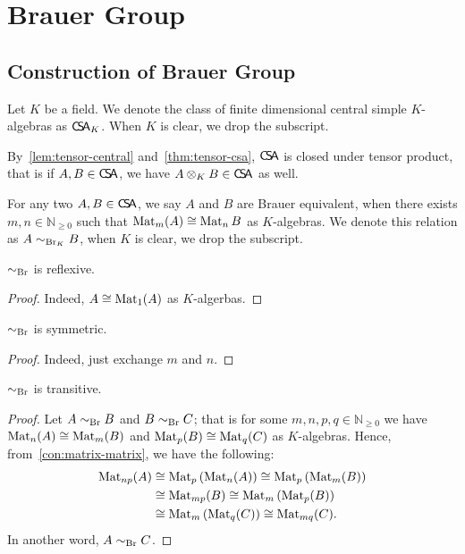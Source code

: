 \chapter{Brauer Group}\label{cha:brauer-group}

\section{Construction of Brauer Group}
Let $K$ be a field. We denote the class of finite dimensional central simple $K$-algebras as $\operatorname{\mathsf{C}\!\mathsf{S}\!\mathsf{A}}_{K}$. When $K$ is clear, we drop the subscript.

\begin{remark}
  By~\cref{lem:tensor-central} and~\cref{thm:tensor-csa}, $\operatorname{\mathsf{C}\!\mathsf{S}\!\mathsf{A}}$ is closed under tensor product, that is if $A, B\in\operatorname{\mathsf{C}\!\mathsf{S}\!\mathsf{A}}$, we have $A\otimes_{K} B\in\operatorname{\mathsf{C}\!\mathsf{S}\!\mathsf{A}}$ as well.
\end{remark}

\begin{definition}
  For any two $A, B\in\operatorname{\mathsf{C}\!\mathsf{S}\!\mathsf{A}}$, we say $A$ and $B$ are Brauer equivalent, when there exists $m, n \in \mathbb{N}_{\ge0}$ such that $\operatorname{Mat}_{m}(A)\cong \operatorname{Mat}_{n}B$ as $K$-algebras. We denote this relation as $A\sim_{\operatorname{Br}_{K}} B$, when $K$ is clear, we drop the subscript.
\end{definition}

\begin{lemma}
  $\sim_{\operatorname{Br}}$ is reflexive.
  \leanok
\end{lemma}
\begin{proof}
  Indeed, $A \cong \operatorname{Mat}_{1}(A)$ as $K$-algerbas.
\end{proof}

\begin{lemma}
  $\sim_{\operatorname{Br}}$ is symmetric.
  \leanok
\end{lemma}
\begin{proof}
  Indeed, just exchange $m$ and $n$.
\end{proof}

\begin{lemma}
  $\sim_{\operatorname{Br}}$ is transitive.
  \leanok
\end{lemma}
\begin{proof}
  Let $A\sim_{\operatorname{Br}}B$ and $B\sim_{\operatorname{Br}}C$; that is for some $m,n,p, q\in\mathbb{N}_{\ge0}$ we have $\operatorname{Mat}_{n}(A)\cong\operatorname{Mat}_{m}(B)$ and $\operatorname{Mat}_{p}(B)\cong \operatorname{Mat}_{q}(C)$ as $K$-algebras. Hence, from~\cref{con:matrix-matrix}, we have the following:
  \[
    \begin{aligned}
      \operatorname{Mat}_{np}(A)&\cong \operatorname{Mat}_{p}\left(\operatorname{Mat}_{n}(A)\right)\cong\operatorname{Mat}_{p}\left(\operatorname{Mat}_{m}(B)\right)\\
                  &\cong\operatorname{Mat}_{mp}(B)\cong\operatorname{Mat}_{m}\left(\operatorname{Mat}_{p}(B)\right)\\
      &\cong\operatorname{Mat}_{m}\left(\operatorname{Mat}_{q}(C)\right)\cong\operatorname{Mat}_{mq}(C).
    \end{aligned}
  \]
  In another word, $A\sim_{\operatorname{Br}}C$.
\end{proof}


